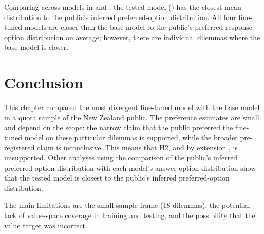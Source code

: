 Comparing across models in  and , the tested model () has the closest mean distribution to the public's inferred preferred-option distribution. All four fine-tuned models are closer than the base model to the public's preferred response-option distribution on average; however, there are individual dilemmas where the base model is closer.



\section{Conclusion}

This chapter compared the most divergent fine-tuned model with the base model in a quota sample of the New Zealand public. The preference estimates are small and depend on the scope: the narrow claim that the public preferred the fine-tuned model on these particular dilemmas is supported, while the broader pre-registered claim is inconclusive. This means that H2, and by extension , is unsupported. Other analyses using the comparison of the public's inferred preferred-option distribution with each model's answer-option distribution show that the tested model is closest to the public's inferred preferred-option distribution.

The main limitations are the small sample frame (18 dilemmas), the potential lack of value-space coverage in training and testing, and the possibility that the value target was incorrect.